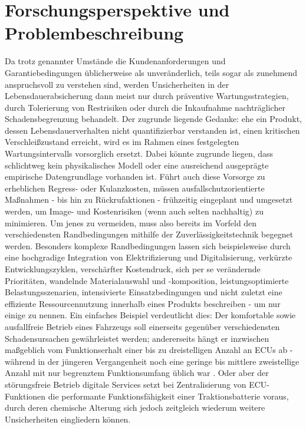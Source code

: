 \section{Forschungsperspektive und Problembeschreibung} \label{sec:problembeschreibung}
Da trotz genannter Umstände die Kundenanforderungen und Garantiebedingungen üblicherweise als unveränderlich, teils sogar als zunehmend anspruchsvoll zu verstehen sind, werden Unsicherheiten in der Lebensdauerabsicherung dann meist nur durch präventive Wartungsstrategien, durch Tolerierung von Restrisiken oder durch die Inkaufnahme nachträglicher Schadensbegrenzung behandelt.
Der zugrunde liegende Gedanke: ehe ein Produkt, dessen Lebensdauerverhalten nicht quantifizierbar verstanden ist, einen kritischen Verschleißzustand erreicht, wird es im Rahmen eines festgelegten Wartungsintervalls vorsorglich ersetzt.
Dabei könnte zugrunde liegen, dass schlichtweg kein physikalisches Modell oder eine ausreichend ausgeprägte empirische Datengrundlage vorhanden ist.
Führt auch diese Vorsorge zu erheblichen Regress- oder Kulanzkosten, müssen ausfallschutzorientierte Maßnahmen - bis hin zu Rückrufaktionen - frühzeitig eingeplant und umgesetzt werden, um Image- und Kostenrisiken (wenn auch selten nachhaltig) zu minimieren.
Um jenes zu vermeiden, muss also bereits im Vorfeld den verschiedensten Randbedingungen mithilfe der Zuverlässigkeitstechnik begegnet werden.
Besonders komplexe Randbedingungen lassen sich beispielsweise durch eine hochgradige Integration von Elektrifizierung und Digitalisierung, verkürzte Entwicklungszyklen, verschärfter Kostendruck, sich per se verändernde Prioritäten, wandelnde Materialauswahl und -komposition, leistungsoptimierte Belastungsszenarien, intensivierte Einsatzbedingungen und nicht zuletzt eine effiziente Ressourcennutzung innerhalb eines Produkts beschreiben - um nur einige zu nennen.
Ein einfaches Beispiel verdeutlicht dies: Der komfortable sowie ausfallfreie Betrieb eines Fahrzeugs soll einerseits gegenüber verschiedensten Schadensursachen gewährleistet werden; andererseits hängt er inzwischen maßgeblich vom Funktionserhalt einer bis zu dreistelligen Anzahl an \acp{ECU} ab - während in der jüngeren Vergangenheit noch eine geringe bis mittlere zweistellige Anzahl mit nur begrenztem Funktionsumfang üblich war \cite{dat.2025}.
Oder aber der störungsfreie Betrieb digitale Services setzt bei Zentralisierung von \ac{ECU}-Funktionen die performante Funktionsfähigkeit einer Traktionsbatterie voraus, durch deren chemische Alterung sich jedoch zeitgleich wiederum weitere Unsicherheiten eingliedern können.
